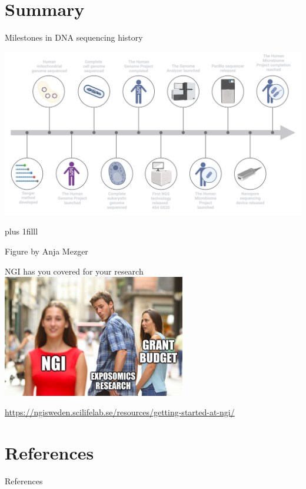 \documentclass[10pt]{beamer}
\newcommand{\creditdark}[1]{{\vskip0pt plus 1filll \par \raggedleft \scriptsize \mdseries \color{scMGray} #1 \par}}
\begin{document}

\section{Summary}


\begin{frame}[standout]{Milestones in DNA sequencing history}
	\vspace*{-1.1cm}
	\begin{center}
		\hspace*{-1.1cm}
		\includegraphics[width=1.2\textwidth]{./figures/timeline.png}
	\end{center}
	\creditdark{Figure by Anja Mezger}
\end{frame}

\begin{frame}[standout]{NGI has you covered for your research}
	\includegraphics[width=0.6\textwidth]{./figures/ngi-meme2.jpg} \par
	\href{https://ngisweden.scilifelab.se/resources/getting-started-at-ngi/}{https://ngisweden.scilifelab.se/resources/getting-started-at-ngi/}
\end{frame}


\section{References}


\begin{frame}[allowframebreaks]{References}
\begingroup
\renewcommand*{\bibfont}{\footnotesize} 
\printbibliography[heading=none]
\endgroup
\end{frame}
\end{document}
